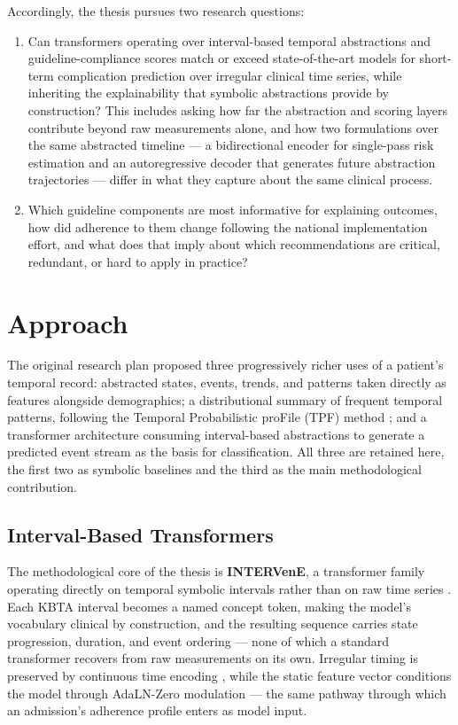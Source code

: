 Accordingly, the thesis pursues two research questions:

\begin{enumerate}
\item Can transformers operating over interval-based temporal abstractions and guideline-compliance scores match or exceed state-of-the-art models for short-term complication prediction over irregular clinical time series, while inheriting the explainability that symbolic abstractions provide by construction? This includes asking how far the abstraction and scoring layers contribute beyond raw measurements alone, and how two formulations over the same abstracted timeline --- a bidirectional encoder for single-pass risk estimation and an autoregressive decoder that generates future abstraction trajectories --- differ in what they capture about the same clinical process.
\item Which guideline components are most informative for explaining outcomes, how did adherence to them change following the national implementation effort, and what does that imply about which recommendations are critical, redundant, or hard to apply in practice?
\end{enumerate}

\section{Approach}

The original research plan proposed three progressively richer uses of a patient's temporal record: abstracted states, events, trends, and patterns taken directly as features alongside demographics; a distributional summary of frequent temporal patterns, following the Temporal Probabilistic proFile (TPF) method \citep{moskovitch2015karmalego, sheetrit2019tpf}; and a transformer architecture consuming interval-based abstractions to generate a predicted event stream as the basis for classification. All three are retained here, the first two as symbolic baselines and the third as the main methodological contribution.

\subsection{Interval-Based Transformers}

The methodological core of the thesis is \textbf{INTERVenE}, a transformer family operating directly on temporal symbolic intervals rather than on raw time series \citep{methodology-paper}. Each KBTA interval becomes a named concept token, making the model's vocabulary clinical by construction, and the resulting sequence carries state progression, duration, and event ordering --- none of which a standard transformer \citep{attention-is-all-you-need} recovers from raw measurements on its own. Irregular timing is preserved by continuous time encoding \citep{kazemi2019time2vec}, while the static feature vector conditions the model through AdaLN-Zero modulation \citep{peebles2023adaln0} --- the same pathway through which an admission's adherence profile enters as model input.

